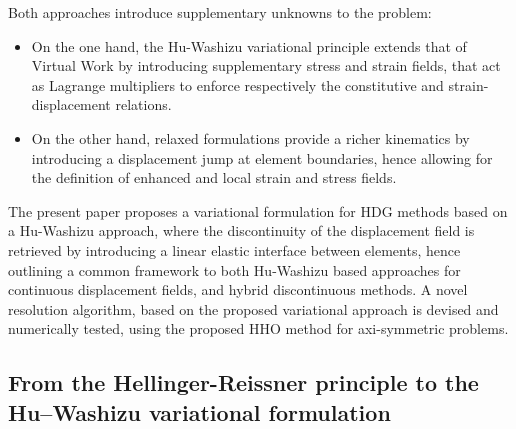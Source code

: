 Both approaches introduce supplementary unknowns to the problem:
\begin{itemize}
  \item On the one hand, the Hu-Washizu variational principle
  extends that of Virtual Work by introducing supplementary stress and
  strain fields, that act as Lagrange multipliers to enforce
  respectively the constitutive and strain-displacement relations.
  \item On the other hand, relaxed formulations provide a richer
  kinematics by introducing a displacement jump at element boundaries,
  hence allowing for the definition of enhanced and local strain and
  stress fields.
\end{itemize}

The present paper proposes a variational formulation for HDG methods
based on a Hu-Washizu approach, where the discontinuity of the
displacement field is retrieved by introducing a linear elastic
interface between elements, hence outlining a common framework to both
Hu-Washizu based approaches for continuous displacement fields, and
hybrid discontinuous methods. A novel resolution algorithm, based on the
proposed variational approach is devised and numerically tested, using
the proposed HHO method for axi-symmetric problems.



\subsection{From the Hellinger-Reissner principle to the Hu–Washizu variational formulation}

